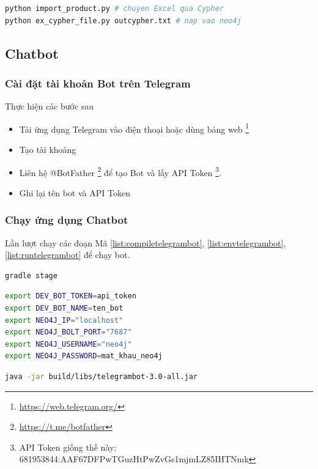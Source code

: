 \begin{lstlisting}[language=bash,caption={Cài Neo4j},label={list:loadneo4jdata}]
python import_product.py # chuyen Excel qua Cypher
python ex_cypher_file.py outcypher.txt # nap vao neo4j 
\end{lstlisting}

\subsection{Chatbot}
\subsubsection{Cài đặt tài khoản Bot trên Telegram}
Thực hiện các bước sau
\begin{itemize}
\item Tải ứng dụng Telegram vào điện thoại hoặc dùng bảng web \footnote{\url{https://web.telegram.org/}}
\item Tạo tài khoảng 
\item Liên hệ @BotFather \footnote{\url{https://t.me/botfather}} để tạo Bot và lấy API Token \footnote{API Token giống thế này: 681953844:AAF67DFPwTGuzHtPwZvGs1mjmLZ85IHTNmk}. 
\item Ghi lại tên bot và API Token 
\end{itemize}

\subsubsection{Chạy ứng dụng Chatbot}

Lần lượt chạy các đoạn Mã \ref{list:compiletelegrambot}, \ref{list:envtelegrambot}, \ref{list:runtelegrambot} để chạy bot. 

\begin{lstlisting}[language=bash,caption={Biên dịch mã nguồn},label={list:compiletelegrambot}]
gradle stage 
\end{lstlisting}

\begin{lstlisting}[language=bash,caption={Tạo các biến môi trường},label={list:envtelegrambot}]
export DEV_BOT_TOKEN=api_token
export DEV_BOT_NAME=ten_bot
export NEO4J_IP="localhost" 
export NEO4J_BOLT_PORT="7687"
export NEO4J_USERNAME="neo4j"
export NEO4J_PASSWORD=mat_khau_neo4j
\end{lstlisting}

\begin{lstlisting}[language=bash,caption={Chạy bot},label={list:runtelegrambot}]
java -jar build/libs/telegrambot-3.0-all.jar
\end{lstlisting}

